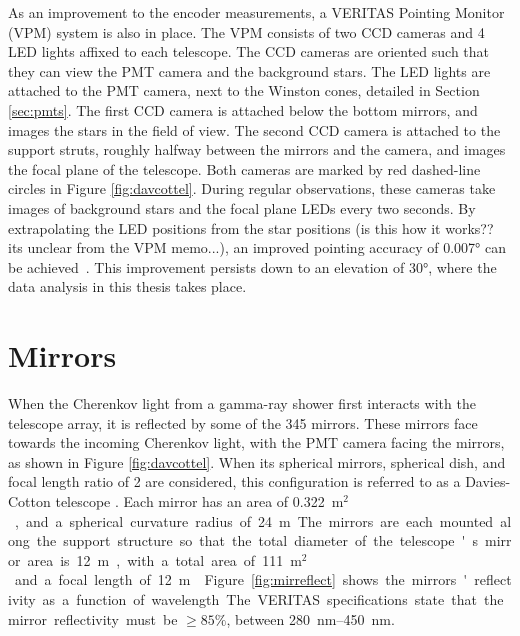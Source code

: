 As an improvement to the encoder measurements, a VERITAS Pointing Monitor (VPM) system is also in place.
The VPM consists of two CCD cameras and 4 LED lights affixed to each telescope.
The CCD cameras are oriented such that they can view the PMT camera and the background stars.
The LED lights are attached to the PMT camera, next to the Winston cones, detailed in Section \ref{sec:pmts}.
The first CCD camera is attached below the bottom mirrors, and images the stars in the field of view.
The second CCD camera is attached to the support struts, roughly halfway between the mirrors and the camera, and images the focal plane of the telescope.
Both cameras are marked by red dashed-line circles in Figure \ref{fig:davcottel}.
During regular observations, these cameras take images of background stars and the focal plane LEDs every two seconds.
By extrapolating the LED positions from the star positions {\color{red}(is this how it works?? its unclear from the VPM memo...)}, an improved pointing accuracy of \nicetilde{}\ang{0.007} can be achieved~\cite{VPMmemo}.
%
This improvement persists down to an elevation of \ang{30}, where the data analysis in this thesis takes place.

\section{Mirrors}\label{sec:mirrors}

When the Cherenkov light from a gamma-ray shower first interacts with the telescope array, it is reflected by some of the 345 mirrors.
These mirrors face towards the incoming Cherenkov light, with the PMT camera facing the mirrors, as shown in Figure \ref{fig:davcottel}.
When its spherical mirrors, spherical dish, and focal length ratio of \nicetilde{}2 are considered, this configuration is referred to as a Davies-Cotton telescope \cite{daviescotton}.
Each mirror has an area of \SI{0.322}{m$^2$}, and a spherical curvature radius of \SI{24}{m}.
The mirrors are each mounted along the support structure so that the total diameter of the telescope's mirror area is \SI{12}{m}, with a total area of \SI{111}{m$^2$} and a focal length of \SI{12}{m} \cite{Veritas_Detector}.
Figure \ref{fig:mirreflect} shows the mirrors' reflectivity as a function of wavelength.
The VERITAS specifications state that the mirror reflectivity must be $\geq 85\%$, between \SIrange{280}{450}{nm}.

